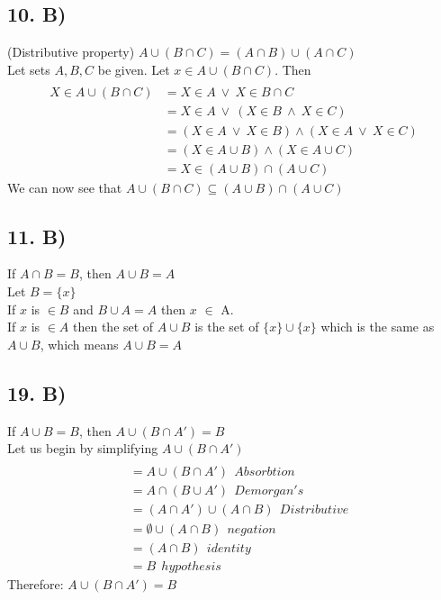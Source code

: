\documentclass[12]{scrartcl}
\begin{document}
\subsection*{10. B)}
(Distributive property) $A \cup(B \cap C) = (A \cap B) \cup (A \cap C)$\\
Let sets $A, B, C$ be given. Let $x \in A \cup (B \cap C)$. Then
\begin{align*} 
\\X \in A \cup (B \cap C)&= X \in A \ \vee \ X \in B \cap C 
\\ &= X \in A \ \vee \ (X \in B \ \wedge \ X \in C)
\\ &=  (X \in A \ \vee \ X \in B) \wedge (X \in A \ \vee \ X \in C)
\\ &= (X \in A \cup B) \wedge (X \in A \cup C)
\\ &= X \in (A \cup B) \cap (A \cup C)
\end{align*} 
We can now see that $A \cup(B \cap C) \subseteq (A \cup B) \cap (A \cup C)$
\subsection*{11. B)}
If $A \cap B = B$, then $A \cup B = A$\\
Let $B = \{x\}$ \\
If $x$ is $\in B$ and $B \cup A = A$ then $x$ $\in$ A. \\
If $x$ is $\in A$ then the set of $A \cup B$ is the set of $ \{x\} \cup \{x\}$ which is the same as $A \cup B$, which means $A \cup B = A$
\subsection*{19. B)}
If $A \cup B = B $, then $A \cup (B \cap A') = B$
\\ Let us begin by simplifying $A \cup (B \cap A')$
\begin{align*} 
\\&= A \cup (B \cap A')  \ \ Absorbtion
\\ &= A \cap (B \cup A') \ \ Demorgan's
\\ &=  (A \cap A') \cup (A \cap B) \ \ Distributive
\\ &=  \emptyset \cup (A \cap B) \ \ negation 
\\ &=  (A \cap B) \ \ identity
\\ &=  B \ \ hypothesis
\end{align*}
Therefore: $A \cup (B \cap A') = B$
\end{document}
